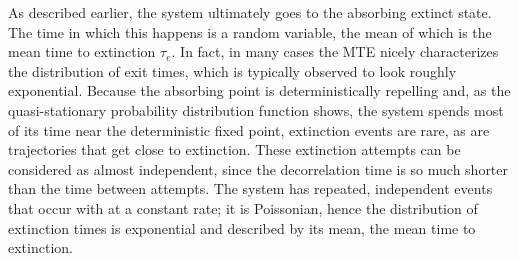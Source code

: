 As described earlier, the system ultimately goes to the absorbing extinct state.
The time in which this happens is a random variable, the mean of which is the mean time to extinction $\tau_e$. %
In fact, in many cases the MTE nicely characterizes the distribution of exit times, which is typically observed to look roughly exponential. 
Because the absorbing point is deterministically repelling and, as the quasi-stationary probability distribution function shows, the system spends most of its time near the deterministic fixed point, extinction events are rare, as are trajectories that get close to extinction. 
These extinction attempts can be considered as almost independent, since the decorrelation time is so much shorter than the time between attempts. 
The system has repeated, independent events that occur with at a constant rate; it is Poissonian, hence the distribution of extinction times is exponential and described by its mean, the mean time to extinction.

